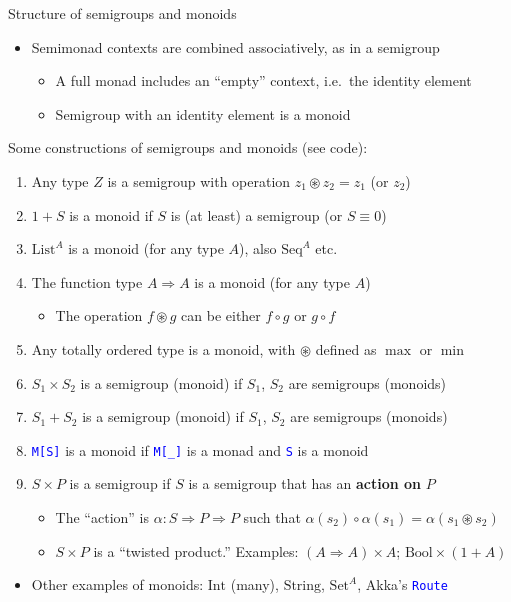 \documentclass[english]{beamer}
\begin{document}
\begin{frame}{Structure of semigroups and monoids}

\begin{itemize}
\item Semimonad contexts are combined associatively, as in a semigroup
\begin{itemize}
\item A full monad includes an ``empty'' context, i.e.\ the identity
element
\item Semigroup with an identity element is a monoid
\end{itemize}
\end{itemize}
Some constructions of semigroups and monoids (see code):
\begin{enumerate}
\item Any type $Z$ is a semigroup with operation $z_{1}\circledast z_{2}=z_{1}$
(or $z_{2}$)
\item $1+S$ is a monoid if $S$ is (at least) a semigroup (or $S\equiv0$)
\item $\text{List}^{A}$ is a monoid (for any type $A$), also $\text{Seq}^{A}$
etc.
\item The function type $A\Rightarrow A$ is a monoid (for any type $A$)
\begin{itemize}
\item The operation $f\circledast g$ can be either $f\circ g$ or $g\circ f$
\end{itemize}
\item Any totally ordered type is a monoid, with $\circledast$ defined
as $\max$ or $\min$
\item $S_{1}\times S_{2}$ is a semigroup (monoid) if $S_{1}$, $S_{2}$
are semigroups (monoids)
\item $S_{1}+S_{2}$ is a semigroup (monoid) if $S_{1}$, $S_{2}$ are semigroups
(monoids)
\item \texttt{\textcolor{blue}{\footnotesize{}M{[}S{]}}} is a monoid if
\texttt{\textcolor{blue}{\footnotesize{}M{[}\_{]}}} is a monad and
\texttt{\textcolor{blue}{\footnotesize{}S}} is a monoid
\item $S\times P$ is a semigroup if $S$ is a semigroup that has an \textbf{action
on} $P$
\begin{itemize}
\item The ``action'' is $\alpha:S\Rightarrow P\Rightarrow P$ such that
$\alpha(s_{2})\circ\alpha(s_{1})=\alpha(s_{1}\circledast s_{2})$
\item $S\times P$ is a ``twisted product.'' Examples: $\left(A\Rightarrow A\right)\times A$;
$\text{Bool}\times\left(1+A\right)$
\end{itemize}
\end{enumerate}
\begin{itemize}
\item Other examples of monoids: $\text{Int}$ (many), $\text{String}$,
$\text{Set}^{A}$, Akka's \texttt{\textcolor{blue}{\footnotesize{}Route}} 
\end{itemize}
\end{frame}
\end{document}
